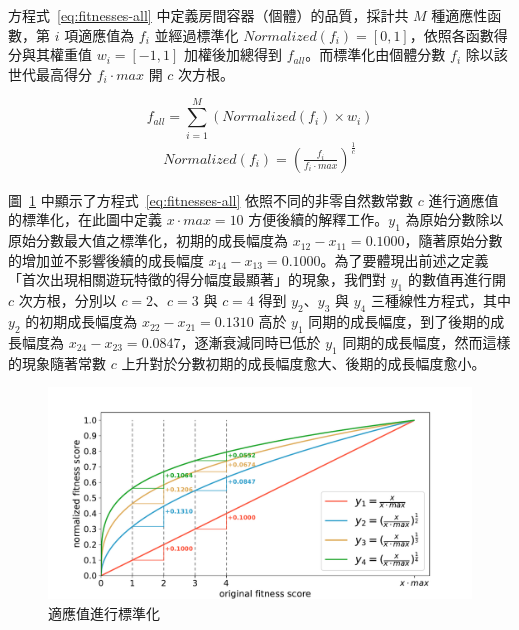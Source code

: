 方程式~\ref{eq:fitnesses-all} 中定義房間容器（個體）的品質，採計共 $M$ 種適應性函數，第 $i$ 項適應值為 $f_{i}$ 並經過標準化 $Normalized(f_{i}) = [0, 1]$，依照各函數得分與其權重值 $w_{i} = [-1, 1]$ 加權後加總得到 $f_{all}$。而標準化由個體分數 $f_{i}$ 除以該世代最高得分 $f_{i}\cdot max$ 開 $c$ 次方根。

\begin{equation}
    \label{eq:fitnesses-all}
    f_{all} = \sum_{i=1}^{M} (Normalized(f_{i}) \times w_{i})
\end{equation}
\begin{gather*}
    Normalized(f_{i}) = (\frac{f_{i}}{f_{i}\cdot max})^{\frac{1}{c}}
\end{gather*}

圖~\ref{fig:fitnesses-normalized} 中顯示了方程式~\ref{eq:fitnesses-all} 依照不同的非零自然數常數 $c$ 進行適應值的標準化，在此圖中定義 $x\cdot max = 10$ 方便後續的解釋工作。$y_{1}$ 為原始分數除以原始分數最大值之標準化，初期的成長幅度為 $x_{12} - x_{11} = 0.1000$，隨著原始分數的增加並不影響後續的成長幅度 $x_{14} - x_{13} = 0.1000$。為了要體現出前述之定義「首次出現相關遊玩特徵的得分幅度最顯著」的現象，我們對 $y_{1}$ 的數值再進行開 $c$ 次方根，分別以 $c = 2$、$c = 3$ 與 $c = 4$ 得到 $y_{2}$、$y_{3}$ 與 $y_{4}$ 三種線性方程式，其中 $y_{2}$ 的初期成長幅度為 $x_{22} - x_{21} = 0.1310$ 高於 $y_{1}$ 同期的成長幅度，到了後期的成長幅度為 $x_{24} - x_{23} = 0.0847$，逐漸衰減同時已低於 $y_{1}$ 同期的成長幅度，然而這樣的現象隨著常數 $c$ 上升對於分數初期的成長幅度愈大、後期的成長幅度愈小。

\begin{figure}[ht]
  \begin{center}
    \includegraphics[width=1.0\textwidth]{figures/fitnesses-normalized.pdf}
    \caption{適應值進行標準化}
    \label{fig:fitnesses-normalized}
  \end{center}
\end{figure}

